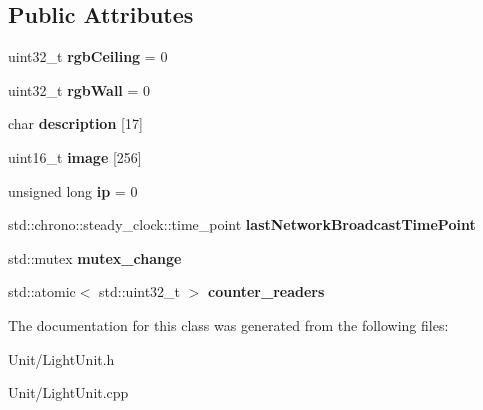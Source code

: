 \subsection*{Public Attributes}
\begin{DoxyCompactItemize}
\item 
uint32\+\_\+t {\bfseries rgb\+Ceiling} = 0\hypertarget{classLightUnit_ae688f610193b69a2f390bd2a44dc2a7c}{}\label{classLightUnit_ae688f610193b69a2f390bd2a44dc2a7c}

\item 
uint32\+\_\+t {\bfseries rgb\+Wall} = 0\hypertarget{classLightUnit_a9927e4bcf968e043883688e87935fb4a}{}\label{classLightUnit_a9927e4bcf968e043883688e87935fb4a}

\item 
char {\bfseries description} \mbox{[}17\mbox{]}\hypertarget{classLightUnit_aad36ad5ba65b93a30ee35ef1f6895b5a}{}\label{classLightUnit_aad36ad5ba65b93a30ee35ef1f6895b5a}

\item 
uint16\+\_\+t {\bfseries image} \mbox{[}256\mbox{]}\hypertarget{classLightUnit_a01f65fda0c55ecd8b1d62911cfa688d2}{}\label{classLightUnit_a01f65fda0c55ecd8b1d62911cfa688d2}

\item 
unsigned long {\bfseries ip} = 0\hypertarget{classLightUnit_a7d490bbccb134d200628eee46ab8fb3d}{}\label{classLightUnit_a7d490bbccb134d200628eee46ab8fb3d}

\item 
std\+::chrono\+::steady\+\_\+clock\+::time\+\_\+point {\bfseries last\+Network\+Broadcast\+Time\+Point}\hypertarget{classLightUnit_ac5f86e26fe02c192736cddd1d06af583}{}\label{classLightUnit_ac5f86e26fe02c192736cddd1d06af583}

\item 
std\+::mutex {\bfseries mutex\+\_\+change}\hypertarget{classLightUnit_a4380f5dead3b35443b09f1dbbe44af55}{}\label{classLightUnit_a4380f5dead3b35443b09f1dbbe44af55}

\item 
std\+::atomic$<$ std\+::uint32\+\_\+t $>$ {\bfseries counter\+\_\+readers}\hypertarget{classLightUnit_aba39125324f42994fd370a25aa276de7}{}\label{classLightUnit_aba39125324f42994fd370a25aa276de7}

\end{DoxyCompactItemize}


The documentation for this class was generated from the following files\+:\begin{DoxyCompactItemize}
\item 
Unit/Light\+Unit.\+h\item 
Unit/Light\+Unit.\+cpp\end{DoxyCompactItemize}
